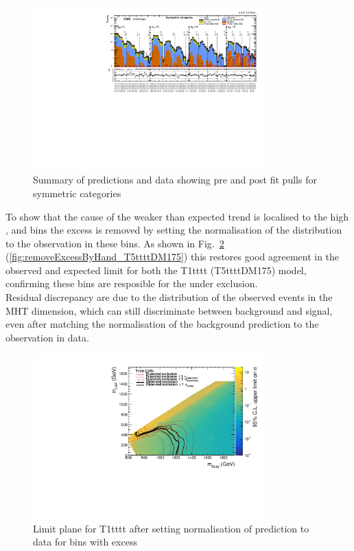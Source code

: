\begin{figure}[tbhp]
  \caption{Summary of predictions and data showing pre and post fit pulls for symmetric categories\label{fig:T1ttttMountainRange}} 
  \begin{center}    
    \includegraphics[width=0.8\textwidth]{figures/susyResults/summaryPlot_Symmetric_prefit_overlay_fit_b}
  \end{center}
\end{figure}

To show that the cause of the weaker than expected trend is localised to the high 
\scalht, \njet and \nb bins the excess is removed by setting the normalisation
of the \mht distribution to the observation in these bins. As shown in 
Fig.~\ref{fig:removeExcessByHand_T1tttt} (\ref{fig:removeExcessByHand_T5ttttDM175}) this restores good agreement in the 
observed and expected limit for both the T1tttt (T5ttttDM175) model, confirming these bins are resposible for the under exclusion. \\
Residual discrepancy are due to the distribution of the observed events in the MHT dimension, 
which can still discriminate between background and signal, even after matching the normalisation of the 
background prediction to the observation in data. 

\begin{figure}[tbhp]
  \caption{Limit plane for T1tttt after setting normalisation of prediction to data for bins with excess \label{fig:removeExcessByHand_T1tttt}} 
  \begin{center}    
    \includegraphics[width=0.8\textwidth]{figures/susyResults/finalCanvasObsLimitXs_excessRemovedByHand_T1tttt}
  \end{center}
\end{figure}

